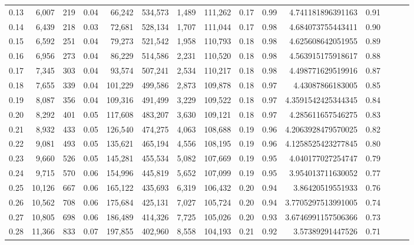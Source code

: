 \begin{tabular}{rrrrrrrrrrrrrrr}
0.13 &   6,007 &    219 &  0.04 &   66,242 &  534,573 &    1,489 &  111,262 &  0.17 &  0.99 &     4.741181896391163 &      0.91 \\
0.14 &   6,439 &    218 &  0.03 &   72,681 &  528,134 &    1,707 &  111,044 &  0.17 &  0.98 &     4.684073755443411 &      0.90 \\
0.15 &   6,592 &    251 &  0.04 &   79,273 &  521,542 &    1,958 &  110,793 &  0.18 &  0.98 &     4.625608642051955 &      0.89 \\
0.16 &   6,956 &    273 &  0.04 &   86,229 &  514,586 &    2,231 &  110,520 &  0.18 &  0.98 &     4.563915175918617 &      0.88 \\
0.17 &   7,345 &    303 &  0.04 &   93,574 &  507,241 &    2,534 &  110,217 &  0.18 &  0.98 &     4.498771629519916 &      0.87 \\
0.18 &   7,655 &    339 &  0.04 &  101,229 &  499,586 &    2,873 &  109,878 &  0.18 &  0.97 &      4.43087866183005 &      0.85 \\
0.19 &   8,087 &    356 &  0.04 &  109,316 &  491,499 &    3,229 &  109,522 &  0.18 &  0.97 &    4.3591542425344345 &      0.84 \\
0.20 &   8,292 &    401 &  0.05 &  117,608 &  483,207 &    3,630 &  109,121 &  0.18 &  0.97 &     4.285611657546275 &      0.83 \\
0.21 &   8,932 &    433 &  0.05 &  126,540 &  474,275 &    4,063 &  108,688 &  0.19 &  0.96 &    4.2063928479570025 &      0.82 \\
0.22 &   9,081 &    493 &  0.05 &  135,621 &  465,194 &    4,556 &  108,195 &  0.19 &  0.96 &    4.1258525423277845 &      0.80 \\
0.23 &   9,660 &    526 &  0.05 &  145,281 &  455,534 &    5,082 &  107,669 &  0.19 &  0.95 &     4.040177027254747 &      0.79 \\
0.24 &   9,715 &    570 &  0.06 &  154,996 &  445,819 &    5,652 &  107,099 &  0.19 &  0.95 &     3.954013711630052 &      0.77 \\
0.25 &  10,126 &    667 &  0.06 &  165,122 &  435,693 &    6,319 &  106,432 &  0.20 &  0.94 &      3.86420519551933 &      0.76 \\
0.26 &  10,562 &    708 &  0.06 &  175,684 &  425,131 &    7,027 &  105,724 &  0.20 &  0.94 &    3.7705297513991005 &      0.74 \\
0.27 &  10,805 &    698 &  0.06 &  186,489 &  414,326 &    7,725 &  105,026 &  0.20 &  0.93 &    3.6746991157506366 &      0.73 \\
0.28 &  11,366 &    833 &  0.07 &  197,855 &  402,960 &    8,558 &  104,193 &  0.21 &  0.92 &      3.57389291447526 &      0.71 \\

\end{tabular}
